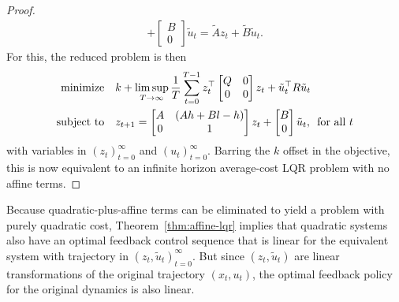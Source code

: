 \documentclass[12pt]{article}
\begin{document}
\begin{proof}
\begin{align*}
        + \begin{bmatrix} B \\ 0 \end{bmatrix}
          \tilde{u}_t
      = \tilde{A} z_t + \tilde{B} \tilde{u}_t.
  \end{align*}
  For this, the reduced problem is then
  \begin{align*}
    \text{minimize}
      &\quad k + \limsup_{T \to \infty} \frac{1}{T} \sum_{t = 0}^{T - 1}
        z_t ^\top \begin{bmatrix} Q & 0 \\ 0 & 0 \end{bmatrix} z_t
        + \tilde{u}_t ^\top R \tilde{u}_t \\
    \text{subject to}
      &\quad z_{t + 1}
        = \begin{bmatrix} A & (Ah + Bl - h) \\ 0 & 1 \end{bmatrix}
          z_t
          + \begin{bmatrix} B \\ 0 \end{bmatrix}
          \tilde{u}_t, \enskip \text{for all \(t\)}
  \end{align*}
  with variables in \((z_t)_{t = 0}^{\infty}\)
  and \((u_t)_{t = 0}^{\infty}\).
  Barring the \(k\) offset in the objective,
  this is now equivalent to an infinite horizon average-cost
  LQR problem with no affine terms.
\end{proof}

Because quadratic-plus-affine terms can be eliminated to yield
a problem with purely quadratic cost,
Theorem~\ref{thm:affine-lqr} implies that
quadratic systems also have an optimal feedback control sequence
that is linear for the equivalent system with
trajectory in \((z_t, \tilde{u}_t)_{t = 0}^{\infty}\).
But since \((z_t, \tilde{u}_t)\) are linear transformations of
the original trajectory \((x_t, u_t)\),
the optimal feedback policy for the original dynamics is also linear.
\end{document}
